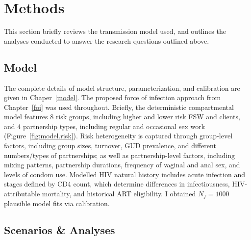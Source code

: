 \section{Methods}\label{art.meth}
This section briefly reviews the transmission model used,
and outlines the analyses conducted to answer the research questions outlined above.
\subsection{Model}\label{art.meth.model}
The complete details of model structure, parameterization, and calibration
are given in Chaper~\ref{model}.
The proposed force of infection approach from Chapter~\ref{foi} was used throughout.
Briefly, the deterministic compartmental model features
8 risk groups, including higher and lower risk FSW and clients, and
4 partnership types, including regular and occasional sex work (Figure~\ref{fig:model.risk}).
Risk heterogeneity is captured through group-level factors, including
group sizes, turnover, GUD prevalence, and different numbers/types of partnerships;
as well as partnership-level factors, including
mixing patterns, partnership durations, frequency of vaginal and anal sex, and levels of condom use.
Modelled HIV natural history includes acute infection and stages defined by CD4 count, which
determine differences in infectiousness, HIV-attributable mortality, and historical ART eligibility.
I obtained $N_f = 1000$ plausible model fits via calibration.
\subsection{Scenarios \& Analyses}\label{art.meth.obj}
